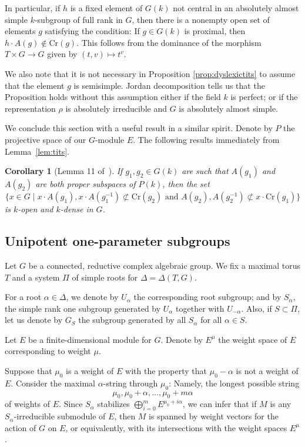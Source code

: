\documentclass{amsart}
\theoremstyle{plain}
\newtheorem{corollary}[theorem]{Corollary}
\theoremstyle{definition}
\theoremstyle{remark}
\begin{document}
In particular, if $h$ is a fixed element of $G(k)$ not central in an absolutely almost simple $k$-subgroup of full rank in $G$, then there is a nonempty
open set of elements $g$ satisfying the condition: If $g \in G(k)$ is proximal, then
$h\cdot A(g) \notin \mathrm{Cr}(g)$. This follows from the dominance of the morphism
$T \times G \to G$ given by $(t, v) \mapsto t^{v}$.

We also note that it is not necessary in Proposition \ref{prop:dyslexictits} to assume that the
element $g$ is semisimple. Jordan decomposition tells us that the Proposition holds without
this assumption
either if the field $k$ is perfect; or if the representation $\rho$ is absolutely
irreducible and $G$ is absolutely almost simple.

We conclude this section with a useful result in a similar spirit. Denote by 
$P$ the projective space of our $G$-module $E$.
The following results immediately from Lemma~\ref{lem:tits}.
\begin{corollary}[Lemma 11 of~\cite{MR613853}]\label{cor:xverse}
If $g_{1}, g_{2} \in G(k)$ are such that $A(g_{1})$ and $A(g_{2})$ are both proper 
subspaces of  $P(k)$,
then the set $$\{x \in G \mid x\cdot A(g_{1}), x \cdot A(g^{-1}_{1}) \not\subset
\mathrm{Cr}(g_{2})\text{ and }
A(g_{2}), A(g^{-1}_{2}) \not\subset x\cdot\mathrm{Cr}(g_{1})\}$$ is $k$-open and
$k$-dense in $G$.
\end{corollary}

\subsection{Unipotent one-parameter subgroups}\label{sec:rank1facts}
Let $G$ be a connected, reductive complex algebraic group.
We fix a maximal torus $T$
and a system $\Pi$ of simple roots for $\Delta = \Delta(T, G)$.

For a root $\alpha \in \Delta$, we denote by $U_{\alpha}$ the corresponding root
subgroup; and by $S_{\alpha}$, the simple rank one
subgroup generated by $U_{\alpha}$ together with $U_{-\alpha}$. Also, if $S \subset
\Pi$, let us denote by $G_{S}$ the subgroup generated by all
$S_{\alpha}$ for all $\alpha \in S$.

Let $E$ be a finite-dimensional module for $G$. Denote by $E^{\mu}$ the weight space
of $E$ corresponding to weight $\mu$.

Suppose that $\mu_{0}$ is a weight of $E$ with the property that $\mu_{0} - \alpha$ is
not a weight of $E$. Consider the
maximal $\alpha$-string through $\mu_{0}$: Namely, the longest possible string
$$\mu_{0}, \mu_{0} + \alpha, \ldots, \mu_{0} + m \alpha$$
of weights of $E$. Since $S_{\alpha}$ stabilizes $\bigoplus_{i = 0}^{m} E^{\mu_{0} +
i \alpha}$, we can infer that if $M$ is any $S_{\alpha}$-irreducible submodule of $E$,
then $M$ is spanned by weight vectors for the action of $G$ on $E$, or equivalently,
with its intersections with the weight spaces $E^{\mu}$.
\end{document}
